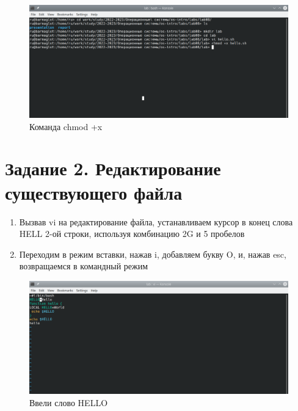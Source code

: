 \documentclass[
  12pt,
  a4paper,
]{scrreprt}
\begin{document}
\begin{figure}
\hypertarget{fig:004}{%
\centering
\includegraphics[width=1\textwidth,height=\textheight]{image/3.png}
\caption{Команда chmod +x}\label{fig:004}
}
\end{figure}

\hypertarget{ux437ux430ux434ux430ux43dux438ux435-2.-ux440ux435ux434ux430ux43aux442ux438ux440ux43eux432ux430ux43dux438ux435-ux441ux443ux449ux435ux441ux442ux432ux443ux44eux449ux435ux433ux43e-ux444ux430ux439ux43bux430}{%
\chapter{Задание 2. Редактирование существующего
файла}\label{ux437ux430ux434ux430ux43dux438ux435-2.-ux440ux435ux434ux430ux43aux442ux438ux440ux43eux432ux430ux43dux438ux435-ux441ux443ux449ux435ux441ux442ux432ux443ux44eux449ux435ux433ux43e-ux444ux430ux439ux43bux430}}

\begin{enumerate}
\def\labelenumi{\arabic{enumi}.}
\item
  Вызвав vi на редактирование файла, устанавливаем курсор в конец слова
  HELL 2-ой строки, используя комбинацию 2G и 5 пробелов
\item
  Переходим в режим вставки, нажав i, добавляем букву O, и, нажав esc,
  возвращаемся в командный режим
\end{enumerate}

\begin{figure}
\hypertarget{fig:005}{%
\centering
\includegraphics[width=1\textwidth,height=\textheight]{image/5.png}
\caption{Ввели слово HELLO}\label{fig:005}
}
\end{figure}
\end{document}
